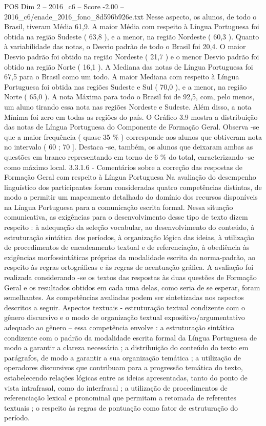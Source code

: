 \begin{textsample}{POS Dim 2 – 2016\_c6 – Score -2.00 – 2016\_c6/enade\_2016\_fono\_8d596b926e.txt}
Nesse aspecto, os alunos, de todo o Brasil, tiveram Média 61,9.
A maior Média com respeito à Língua Portuguesa foi obtida na região Sudeste ( 63,8 ), e a menor, na região Nordeste ( 60,3 ).
Quanto à variabilidade das notas, o Desvio padrão de todo o Brasil foi 20,4.
O maior Desvio padrão foi obtido na região Nordeste ( 21,7 ) e o menor Desvio padrão foi obtido na região Norte ( 16,1 ).
A Mediana das notas de Língua Portuguesa foi 67,5 para o Brasil como um todo.
A maior Mediana com respeito à Língua Portuguesa foi obtida nas regiões Sudeste e Sul ( 70,0 ), e a menor, na região Norte ( 65,0 ).
A nota Máxima para todo o Brasil foi de 92,5, com, pelo menos, um aluno tirando essa nota nas regiões Nordeste e Sudeste.
Além disso, a nota Mínima foi zero em todas as regiões do país.
O Gráfico 3.9 mostra a distribuição das notas de Língua Portuguesa do Componente de Formação Geral.
Observa -se que a maior frequência ( quase 35 \% ) corresponde aos alunos que obtiveram nota no intervalo ( 60 ; 70 ].
Destaca -se, também, os alunos que deixaram ambas as questões em branco representando em torno de 6 \% do total, caracterizando -se como máximo local. 3.3.1.6 - Comentários sobre a correção das respostas de Formação Geral com respeito à Língua Portuguesa Na avaliação do desempenho linguístico dos participantes foram consideradas quatro competências distintas, de modo a permitir um mapeamento detalhado do domínio dos recursos disponíveis na Língua Portuguesa para a comunicação escrita formal.
Nessa situação comunicativa, as exigências para o desenvolvimento desse tipo de texto dizem respeito : à adequação da seleção vocabular, ao desenvolvimento do conteúdo, à estruturação sintática dos períodos, à organização lógica das ideias, à utilização de procedimentos de encadeamento textual e de referenciação, à obediência às exigências morfossintáticas próprias da modalidade escrita da norma-padrão, ao respeito às regras ortográficas e às regras de acentuação gráfica.
A avaliação foi realizada considerando -se os textos das respostas às duas questões de Formação Geral e os resultados obtidos em cada uma delas, como seria de se esperar, foram semelhantes.
As competências avaliadas podem ser sintetizadas nos aspectos descritos a seguir.
Aspectos textuais - estruturação textual condizente com o gênero discursivo e o modo de organização textual expositivo/argumentativo adequado ao gênero – essa competência envolve : a estruturação sintática condizente com o padrão da modalidade escrita formal da Língua Portuguesa de modo a garantir a clareza necessária ; a distribuição do conteúdo do texto em parágrafos, de modo a garantir a sua organização temática ; a utilização de operadores discursivos que contribuam para a progressão temática do texto, estabelecendo relações lógicas entre as ideias apresentadas, tanto do ponto de vista intrafrasal, como do interfrasal ; a utilização de procedimentos de referenciação lexical e pronominal que permitam a retomada de referentes textuais ; o respeito às regras de pontuação como fator de estruturação do período.

\end{textsample}
